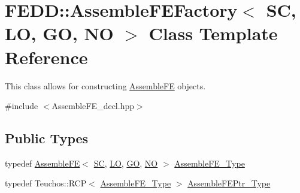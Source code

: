 \hypertarget{classFEDD_1_1AssembleFEFactory}{}\section{F\+E\+DD\+:\+:Assemble\+F\+E\+Factory$<$ SC, LO, GO, NO $>$ Class Template Reference}
\label{classFEDD_1_1AssembleFEFactory}


This class allows for constructing \hyperlink{classFEDD_1_1AssembleFE}{Assemble\+FE} objects.  




{\ttfamily \#include $<$Assemble\+F\+E\+\_\+decl.\+hpp$>$}

\subsection*{Public Types}
\begin{DoxyCompactItemize}
\item 
typedef \hyperlink{classFEDD_1_1AssembleFE}{Assemble\+FE}$<$ \hyperlink{fe__test__laplace_8cpp_a79c7e86a57edbb2a5a53242bcd04e41e}{SC}, \hyperlink{fe__test__laplace_8cpp_ad6a38c9f07d3fd633eefca5bccad8410}{LO}, \hyperlink{fe__test__laplace_8cpp_afa2946b509009b4f45eb04bd8c5b27d9}{GO}, \hyperlink{fe__test__laplace_8cpp_a5e24f37b28787429872b6ecb1d0417ce}{NO} $>$ \hyperlink{classFEDD_1_1AssembleFEFactory_a42c8b5387f23fea233cb2c9b2bfc379f}{Assemble\+F\+E\+\_\+\+Type}
\item 
typedef Teuchos\+::\+R\+CP$<$ \hyperlink{classFEDD_1_1AssembleFEFactory_a42c8b5387f23fea233cb2c9b2bfc379f}{Assemble\+F\+E\+\_\+\+Type} $>$ \hyperlink{classFEDD_1_1AssembleFEFactory_aa7e0143080c2d0fbe8df0d26c55d6b5c}{Assemble\+F\+E\+Ptr\+\_\+\+Type}
\end{DoxyCompactItemize}

